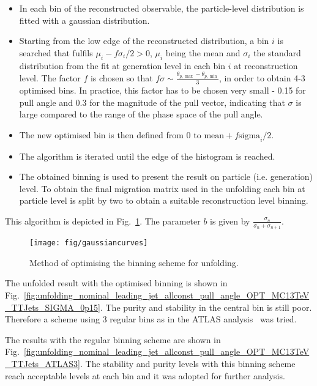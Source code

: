 \begin{itemize}
\item In each bin of the reconstructed observable, the particle-level distribution is fitted with a gaussian distribution.
\item Starting from the low edge of the reconstructed distribution, a bin $i$ is searched that fulfils $\mu_{i}-f\sigma_{i}/2 > 0$, $\mu_{i}$ being the mean and $\sigma_{i}$ the standard distribution from the fit at generation level in each bin $i$ at reconstruction level. The factor $f$ is chosen so that $f\sigma\sim\frac{\theta_{p,\max}-\theta_{p, \min}}{3}$, in order to obtain 4-3 optimised bins. In practice, this factor has to be chosen very small - 0.15 for pull angle and 0.3 for the magnitude of the pull vector, indicating that $\sigma$ is large compared to the range of the phase space of the pull angle.
\item The new optimised bin is then defined from 0 to $\text{mean}+f\text{sigma}_{i}/2$. 
\item The algorithm is iterated until the edge of the histogram is reached.
\item The obtained binning is used to present the result on particle (i.e. generation) level. To obtain the final migration matrix used in the unfolding each bin at particle level is split by two to obtain a suitable reconstruction level binning.
\end{itemize}

This algorithm is depicted in Fig.~\ref{fig:gaussiancurves}. The parameter $b$ is given by $\frac{\sigma_{n}}{\sigma_{n} + \sigma_{n+1}}$.

\begin{figure}
  \centering
  \texttt{[image: fig/gaussiancurves]}
  \caption{Method of optimising the binning scheme for unfolding.}
  \label{fig:gaussiancurves}
\end{figure}

The unfolded result with the optimised binning is shown in Fig.~\ref{fig:unfolding_nominal_leading_jet_allconst_pull_angle_OPT_MC13TeV_TTJets_SIGMA_0p15}. The purity and stability in the central bin is still poor. Therefore a scheme using 3 regular bins as in the ATLAS analysis~\cite{ATLAS:2017iaz} was tried.

The results with the regular binning scheme are shown in Fig.~\ref{fig:unfolding_nominal_leading_jet_allconst_pull_angle_OPT_MC13TeV_TTJets_ATLAS3}. The stability and purity levels with this binning scheme reach acceptable levels at each bin and it was adopted for further analysis.

